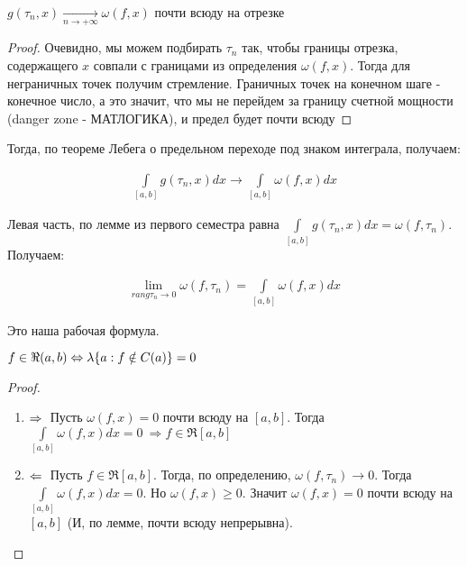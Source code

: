 \begin{statement}
$g(\tau_n, x) \xrightarrow[n \rightarrow +\infty]{} \omega(f, x)$ почти всюду на отрезке
\end{statement}

\begin{proof}
Очевидно, мы можем подбирать $\tau_n$ так, чтобы границы отрезка, содержащего $x$ совпали с границами из определения $\omega(f,x)$. Тогда для неграничных точек получим стремление. Граничных точек на конечном шаге - конечное число, а это значит, что мы не перейдем за границу счетной мощности (danger zone - МАТЛОГИКА), и предел будет почти всюду 
\end{proof}

Тогда, по теореме Лебега о предельном переходе под знаком интеграла, получаем:

\begin{gather*}
\int\limits_{[a, b]}g(\tau_n, x)dx \rightarrow \int\limits_{[a,b]}\omega(f,x)dx
\end{gather*}

Левая часть, по лемме из первого семестра равна $\int\limits_{[a, b]}g(\tau_n, x)dx = \omega(f, \tau_n)$.
Получаем:

\begin{gather*}
\lim\limits_{rang\tau_n \rightarrow 0} \omega(f, \tau_n) = \int\limits_{[a,b]} \omega(f,x)dx
\end{gather*}

Это наша рабочая формула.

\begin{theorem}
$\\ f \in \Re (a, b) \Leftrightarrow \lambda\{ a : f \notin C(a) \} = 0$
\end{theorem}

\begin{proof}
	\begin{enumerate}
		\item 
			$\Rightarrow \\$ Пусть $\omega(f,x) = 0$ почти всюду на $[a, b]$. Тогда $\int\limits_{[a,b]} \omega(f, x)dx = 0 \: \Rightarrow f \in \Re [a,b]$ 
		\item 
			$\Leftarrow \\$ Пусть $f \in \Re [a, b]$. Тогда, по определению, $\omega(f, \tau_n) \rightarrow 0$. Тогда $\int\limits_{[a,b]} \omega(f, x)dx = 0$. Но $\omega(f, x) \geqslant 0$. Значит $\omega(f,x) = 0$ почти всюду на $[a,b]$ (И, по лемме, почти всюду непрерывна).
	\end{enumerate}
\end{proof}
